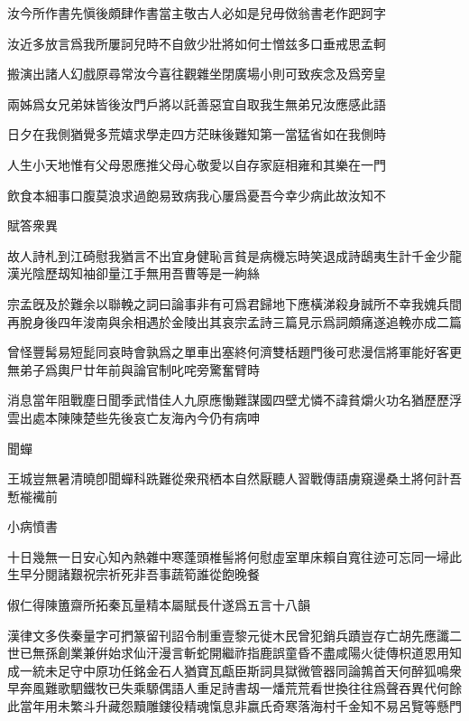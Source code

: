 \documentclass{zhvt-classic-Miya}
\begin{document}
汝今所作書先愼後頗肆作書當主敬古人必如是兒毋傚翁書老作跁跒字

汝近多放言爲我所屢訶兒時不自斂少壯將如何士憎兹多口垂戒思孟軻

搬演出諸人幻戲原尋常汝今喜往觀雜坐閉廣場小則可致疾念及爲旁皇

兩姊爲女兄弟妹皆後汝門戶將以託善惡宜自取我生無弟兄汝應感此語

日夕在我側猶覺多荒嬉求學走四方茫昧後難知第一當猛省如在我側時

人生小天地惟有父母恩應推父母心敬愛以自存家庭相雍和其樂在一門

飲食本細事口腹莫浪求過飽易致病我心屢爲憂吾今幸少病此故汝知不

\begin{fw}賦答衆異\end{fw}

故人詩札到江碕慰我猶言不出宜身健恥言貧是病機忘時笑退成詩鴟夷生計千金少龍漢光陰歷刼知袖卻量江手無用吾曹等是一絇絲

\begin{fw}宗孟旣及於難余以聯輓之詞曰論事非有可爲君歸地下應橫涕殺身誠所不幸我媿兵間再脫身後四年浚南與余相遇於金陵出其哀宗孟詩三篇見示爲詞頗痛遂追輓亦成二篇\end{fw}

曾怪豐髯易短髭同哀時會孰爲之單車出塞終何濟雙栝題門後可悲漫信將軍能好客更無弟子爲輿尸廿年前與論官制叱咤旁驚奮臂時

消息當年阻戰塵日聞季武惜佳人九原應慟難謀國四壁尤憐不諱貧爝火功名猶歷歷浮雲出處本陳陳楚些先後哀亡友海內今仍有病呻

\begin{fw}聞蟬\end{fw}

王城豈無暑清曉卽聞蟬科跣難從衆飛栖本自然厭聽人習戰傳語虜窺邊桑土將何計吾慙褦襶前

\begin{fw}小病憤書\end{fw}

十日幾無一日安心知內熱雜中寒蓬頭椎髻將何慰虛室單床賴自寬往迹可忘同一埽此生早分閱諸艱祝宗祈死非吾事蔬筍誰從飽晚餐

\begin{fw}俶仁得陳簠齋所拓秦瓦量精本屬賦長什遂爲五言十八韻\end{fw}

漢律文多佚秦量字可捫篆留刊詔令制重壹黎元徙木民曾犯銷兵蹟豈存亡胡先應讖二世已無孫創業兼倂始求仙汗漫言斬蛇開繼祚指鹿誤童昏不盡咸陽火徒傳枳道恩用知成一統未足守中原功任銘金石人猶寶瓦甗臣斯詞具獄微管器同論鶉首天何醉狐鳴衆早奔風難歌駟鐵牧已失乘騵偶語人重足詩書刼一燔荒荒看世換往往爲聲吞異代何餘此當年用未繁斗升藏怨黷雕鏤役精魂愾息非嬴氏奇寒落海村千金知不易呂覽等懸門
\end{document}
